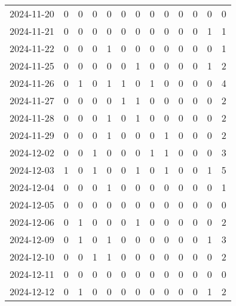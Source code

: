 \documentclass[dvipdfmx,oneside]{article}
\begin{document}
\begin{longtable}{lcccccccccccc}
        2024-11-20 &     0 &     0 &     0 &     0 &     0 &     0 &     0 &     0 &     0 &     0 &     0 &      0 \\
        2024-11-21 &     0 &     0 &     0 &     0 &     0 &     0 &     0 &     0 &     0 &     0 &     1 &      1 \\
        2024-11-22 &     0 &     0 &     0 &     1 &     0 &     0 &     0 &     0 &     0 &     0 &     0 &      1 \\
        2024-11-25 &     0 &     0 &     0 &     0 &     0 &     1 &     0 &     0 &     0 &     0 &     1 &      2 \\
        2024-11-26 &     0 &     1 &     0 &     1 &     1 &     0 &     1 &     0 &     0 &     0 &     0 &      4 \\
        2024-11-27 &     0 &     0 &     0 &     0 &     1 &     1 &     0 &     0 &     0 &     0 &     0 &      2 \\
        2024-11-28 &     0 &     0 &     0 &     1 &     0 &     1 &     0 &     0 &     0 &     0 &     0 &      2 \\
        2024-11-29 &     0 &     0 &     0 &     1 &     0 &     0 &     0 &     1 &     0 &     0 &     0 &      2 \\
        2024-12-02 &     0 &     0 &     1 &     0 &     0 &     0 &     1 &     1 &     0 &     0 &     0 &      3 \\
        2024-12-03 &     1 &     0 &     1 &     0 &     0 &     1 &     0 &     1 &     0 &     0 &     1 &      5 \\
        2024-12-04 &     0 &     0 &     0 &     1 &     0 &     0 &     0 &     0 &     0 &     0 &     0 &      1 \\
        2024-12-05 &     0 &     0 &     0 &     0 &     0 &     0 &     0 &     0 &     0 &     0 &     0 &      0 \\
        2024-12-06 &     0 &     1 &     0 &     0 &     0 &     1 &     0 &     0 &     0 &     0 &     0 &      2 \\
        2024-12-09 &     0 &     1 &     0 &     1 &     0 &     0 &     0 &     0 &     0 &     0 &     1 &      3 \\
        2024-12-10 &     0 &     0 &     1 &     1 &     0 &     0 &     0 &     0 &     0 &     0 &     0 &      2 \\
        2024-12-11 &     0 &     0 &     0 &     0 &     0 &     0 &     0 &     0 &     0 &     0 &     0 &      0 \\
        2024-12-12 &     0 &     1 &     0 &     0 &     0 &     0 &     0 &     0 &     0 &     0 &     1 &      2 \\

\end{longtable}
\end{document}
